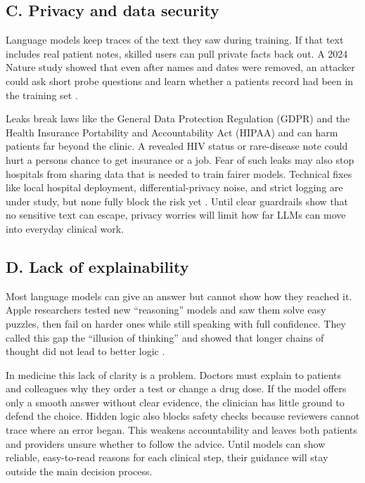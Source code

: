 \documentclass[12pt,a4paper]{scrreprt}
\begin{document}
\subsection*{C. Privacy and data security}
Language models keep traces of the text they saw during training. If that text includes real patient notes, skilled users can pull private facts back out. A 2024 Nature study showed that even after names and dates were removed, an attacker could ask short probe questions and learn whether a patients record had been in the training set \autocite{Privacy}.\par
\vspace{\baselineskip}
\noindent
Leaks break laws like the General Data Protection Regulation (GDPR) and the Health Insurance Portability and Accountability Act (HIPAA) and can harm patients far beyond the clinic. A revealed HIV status or rare-disease note could hurt a persons chance to get insurance or a job. Fear of such leaks may also stop hospitals from sharing data that is needed to train fairer models. Technical fixes like local hospital deployment, differential-privacy noise, and strict logging are under study, but none fully block the risk yet \autocite{Privacy2}. Until clear guardrails show that no sensitive text can escape, privacy worries will limit how far LLMs can move into everyday clinical work.


\subsection*{D. Lack of explainability}
Most language models can give an answer but cannot show how they reached it. Apple researchers tested new “reasoning” models and saw them solve easy puzzles, then fail on harder ones while still speaking with full confidence. They called this gap the “illusion of thinking” and showed that longer chains of thought did not lead to better logic \autocite{Apple}.\par
\vspace{\baselineskip}
\noindent
In medicine this lack of clarity is a problem. Doctors must explain to patients and colleagues why they order a test or change a drug dose. If the model offers only a smooth answer without clear evidence, the clinician has little ground to defend the choice. Hidden logic also blocks safety checks because reviewers cannot trace where an error began. This weakens accountability and leaves both patients and providers unsure whether to follow the advice. Until models can show reliable, easy-to-read reasons for each clinical step, their guidance will stay outside the main decision process.
\end{document}
